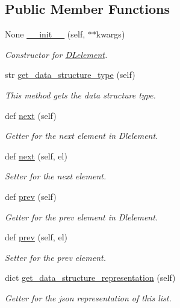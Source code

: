 \subsection*{Public Member Functions}
\begin{DoxyCompactItemize}
\item 
None \mbox{\hyperlink{classbridges_1_1dl__element_1_1_d_lelement_a159beec2192949eb33d5b4b6dba182ff}{\+\_\+\+\_\+init\+\_\+\+\_\+}} (self, $\ast$$\ast$kwargs)
\begin{DoxyCompactList}\small\item\em Constructor for \mbox{\hyperlink{classbridges_1_1dl__element_1_1_d_lelement}{D\+Lelement}}. \end{DoxyCompactList}\item 
str \mbox{\hyperlink{classbridges_1_1dl__element_1_1_d_lelement_a6ffddb5ac79a3945c1559dbc2236ab81}{get\+\_\+data\+\_\+structure\+\_\+type}} (self)
\begin{DoxyCompactList}\small\item\em This method gets the data structure type. \end{DoxyCompactList}\item 
def \mbox{\hyperlink{classbridges_1_1dl__element_1_1_d_lelement_a43077e810ec453c9cd512ba75819e28a}{next}} (self)
\begin{DoxyCompactList}\small\item\em Getter for the next element in Dlelement. \end{DoxyCompactList}\item 
def \mbox{\hyperlink{classbridges_1_1dl__element_1_1_d_lelement_ae46f630cd7384689d4305770e6b2c7c1}{next}} (self, el)
\begin{DoxyCompactList}\small\item\em Setter for the next element. \end{DoxyCompactList}\item 
def \mbox{\hyperlink{classbridges_1_1dl__element_1_1_d_lelement_a66e7c4bfb2216a68744fe58c24e9917f}{prev}} (self)
\begin{DoxyCompactList}\small\item\em Getter for the prev element in Dlelement. \end{DoxyCompactList}\item 
def \mbox{\hyperlink{classbridges_1_1dl__element_1_1_d_lelement_a17c371ec0c38e9555e55551d9be4d185}{prev}} (self, el)
\begin{DoxyCompactList}\small\item\em Setter for the prev element. \end{DoxyCompactList}\item 
dict \mbox{\hyperlink{classbridges_1_1dl__element_1_1_d_lelement_aa64bd3f44ef45870456bf7bea80daadd}{get\+\_\+data\+\_\+structure\+\_\+representation}} (self)
\begin{DoxyCompactList}\small\item\em Getter for the json representation of this list. \end{DoxyCompactList}\end{DoxyCompactItemize}
